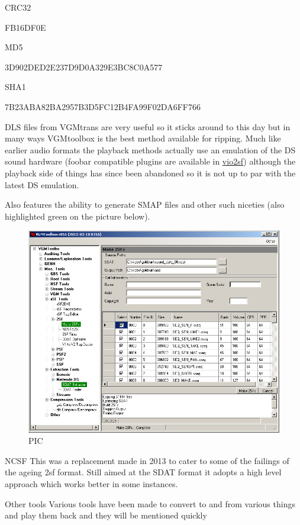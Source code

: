 \documentclass[
]{book}
\begin{document}
CRC32

FB16DF0E

MD5

3D902DED2E237D9D0A329E3BC8C0A577

SHA1

7B23ABA82BA2957B3D5FC12B4FA99F02DA6FF766

DLS files from VGMtrans are very useful so it sticks around to this day but in many ways VGMtoolbox is the best method available for ripping. Much like earlier audio formats the playback methods actually use an emulation of the DS sound hardware (foobar compatible plugins are available in \href{http://filetrip.net/nds-downloads/utilities/download-vio2sf-2011-05-27-foobar-f29356.html}{vio2sf}) although the playback side of things has since been abandoned so it is not up to par with the latest DS emulation.

Also features the ability to generate SMAP files and other such niceties (also highlighted green on the picture below).

\begin{figure}
\centering
\includegraphics{images/137_home_fast6191_romhackingguide_unrenamed_files_and_original_borders_romhackguidevgmtoolbox1.png}
\caption{PIC}
\end{figure}

NCSF This was a replacement made in 2013 to cater to some of the failings of the ageing 2sf format. Still aimed at the SDAT format it adopts a high level approach which works better in some instances.

Other tools Various tools have been made to convert to and from various things and play them back and they will be mentioned quickly
\end{document}
